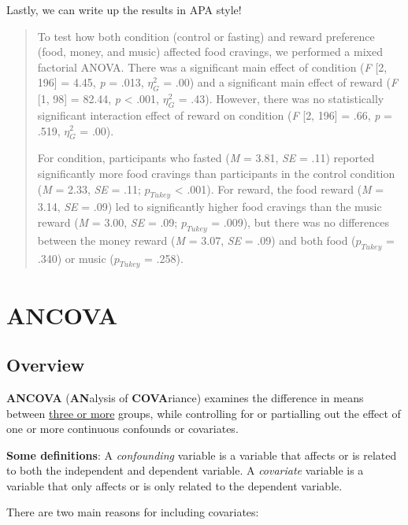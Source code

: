 \documentclass[
]{book}
\begin{document}
Lastly, we can write up the results in APA style!

\begin{quote}
To test how both condition (control or fasting) and reward preference (food, money, and music) affected food cravings, we performed a mixed factorial ANOVA. There was a significant main effect of condition (\emph{F} {[}2, 196{]} = 4.45, \emph{p} = .013, \(\eta^2_G\) = .00) and a significant main effect of reward (\emph{F} {[}1, 98{]} = 82.44, \emph{p} \textless{} .001, \(\eta^2_G\) = .43). However, there was no statistically significant interaction effect of reward on condition (\emph{F} {[}2, 196{]} = .66, \emph{p} = .519, \(\eta^2_G\) = .00).

For condition, participants who fasted (\emph{M} = 3.81, \emph{SE} = .11) reported significantly more food cravings than participants in the control condition (\emph{M} = 2.33, \emph{SE} = .11; \(p_{Tukey}\) \textless{} .001). For reward, the food reward (\emph{M} = 3.14, \emph{SE} = .09) led to significantly higher food cravings than the music reward (\emph{M} = 3.00, \emph{SE} = .09; \(p_{Tukey}\) = .009), but there was no differences between the money reward (\emph{M} = 3.07, \emph{SE} = .09) and both food (\(p_{Tukey}\) = .340) or music (\(p_{Tukey}\) = .258).
\end{quote}

\hypertarget{ancova}{%
\section{ANCOVA}\label{ancova}}

\hypertarget{overview-9}{%
\subsection{Overview}\label{overview-9}}

\textbf{ANCOVA} (\textbf{AN}alysis of \textbf{COVA}riance) examines the difference in means between \underline{three or more} groups, while controlling for or partialling out the effect of one or more continuous confounds or covariates.

\textbf{Some definitions}: A \emph{confounding} variable is a variable that affects or is related to both the independent and dependent variable. A \emph{covariate} variable is a variable that only affects or is only related to the dependent variable.

There are two main reasons for including covariates:
\end{document}

